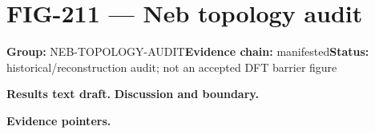 \clearpage
\section{FIG-211 --- Neb topology audit}
\label{figpage:fig-211}
\textbf{Group:} NEB-TOPOLOGY-AUDIT\quad \textbf{Evidence chain:} manifested\quad \textbf{Status:} historical/reconstruction audit; not an accepted DFT barrier figure

\textbf{Results text draft.} 
\textbf{Discussion and boundary.} 


\textbf{Evidence pointers.}



\vfill
